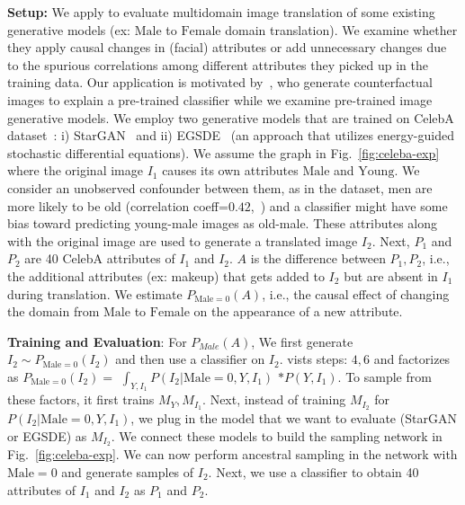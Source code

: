 \documentclass{article}
\newcommand{\red}{\textcolor{red}}
\newcommand{\idgen}{\text{ID-GEN}\xspace}
\newcommand{\YO}{\mathrm{Young}\xspace}
\newcommand{\MA}{\mathrm{Male}\xspace}
\newcommand{\FE}{\mathrm{Female}\xspace}
\theoremstyle{plain}
\theoremstyle{definition}
\theoremstyle{remark}
\begin{document}
\textbf{Setup:}
%
We apply \idgen to evaluate multidomain image translation of some existing generative models (ex: $\MA$ to $\FE$ domain translation).
We examine whether they apply causal changes in (facial) attributes or add unnecessary changes due to the spurious correlations among different attributes they picked up in the training data.
Our application is motivated by~\citet{goyal2019explaining}, who generate counterfactual images to explain a pre-trained classifier while we examine pre-trained image generative models.
We employ two generative models that are trained on CelebA dataset~\citep{liu2015faceattributes}: i) StarGAN~\citep{choi2018stargan} and ii) EGSDE~\citep{zhao2022egsde}
(an approach that utilizes energy-guided stochastic differential equations).
 We assume the graph in Fig.~\ref{fig:celeba-exp} where the original image $I_1$ causes its own attributes $\MA$ and $\YO$. 
We consider an unobserved confounder between them, as in the dataset, men are more likely to be old (correlation coeff=$0.42$,~\citep{shen2020interpreting}) and a classifier might have some bias toward predicting young-male images as old-male.
%
%
 These attributes along with the original image are used to  generate a translated image $I_2$.
Next, $P_1$ and $P_2$ are 40 CelebA attributes of $I_1$ and $I_2$.
$A$ is the difference between $P_1, P_2$, i.e., the additional attributes (ex: makeup) that gets added to $I_2$ but are absent in $I_1$ during translation.
%
We estimate $P_{\MA=0}(A)$, i.e., the causal effect of changing the domain from $\MA$ to $\FE$ on the appearance of a new attribute. 
\par
\textbf{Training and Evaluation}:
For $P_{Male}(A)$,
We first generate $I_2\sim P_{\MA=0}(I_2)$ and then use a classifier on $I_2$. 
\idgen vists steps: $4, 6$ and factorizes as $P_{\MA=0}(I_2)=$ $\int_{Y, I_1}P(I_2|\MA=0, Y, I_1)$ $* P(Y, I_1)$. 
To sample from these factors, it first trains $M_{Y}, M_{I_1}$.
Next, instead of training $M_{I_2}$ for $P(I_2|\MA=0, Y, I_1)$, we plug in the model that we want to evaluate (StarGAN or EGSDE) as $M_{I_2}$. We connect these models to build the sampling network in Fig.~\ref{fig:celeba-exp}. 
 We can now perform ancestral sampling in the network with $\MA=0$ and generate samples of $I_2$.
Next, we use a classifier to obtain 40 attributes of $I_1$ and $I_2$ as $P_1$ and $P_2$. 
\end{document}
